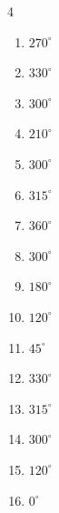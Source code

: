 \begin{multicols}{4}
\begin{enumerate}
  \item $\displaystyle 270^{\circ}$

  \item $\displaystyle 330^{\circ}$

  \item $\displaystyle 300^{\circ}$

  \item $\displaystyle 210^{\circ}$

  \item $\displaystyle 300^{\circ}$

\columnbreak %

  \item $\displaystyle 315^{\circ}$

  \item $\displaystyle 360^{\circ}$
        \phantom{$\displaystyle =2\pi$}

  \item $\displaystyle 300^{\circ}$

  \item $\displaystyle 180^{\circ}$
        \phantom{$\displaystyle =\pi$}

  \item $\displaystyle 120^{\circ}$

  \item $\displaystyle 45^{\circ}$

  \item $\displaystyle 330^{\circ}$

  \item $\displaystyle 315^{\circ}$

  \item $\displaystyle 300^{\circ}$

  \item $\displaystyle 120^{\circ}$

  \item $\displaystyle 0^{\circ}$
        \phantom{$\displaystyle =0$}


\end{enumerate}
\end{multicols}
